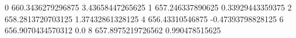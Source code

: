 0 660.3436279296875 3.43658447265625
1 657.246337890625 0.33929443359375
2 658.2813720703125 1.37432861328125
4 656.43310546875 -0.47393798828125
6 656.9070434570312 0.0
8 657.8975219726562 0.990478515625
